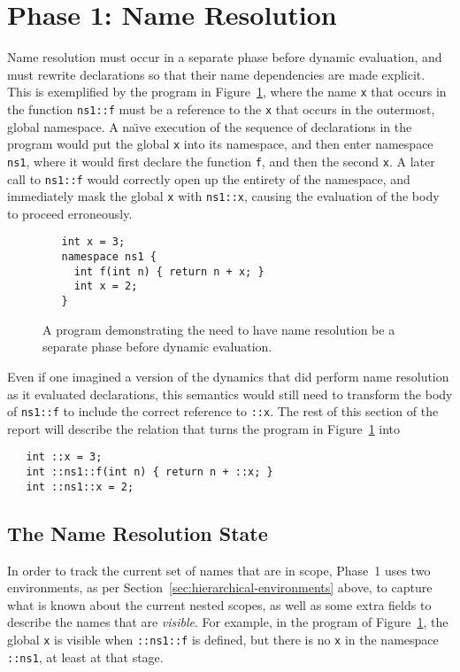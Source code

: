 \documentclass[11pt]{article}
\newcommand{\naive}{na\"\i{}ve}
\begin{document}
\section{Phase 1: Name Resolution}
\label{sec:phase1}

Name resolution must occur in a separate phase before dynamic
evaluation, and must rewrite declarations so that their name
dependencies are made explicit.  This is exemplified by the program in
Figure~\ref{fig:name-res-separate-phase}, where the name \texttt{x}
that occurs in the function \texttt{ns1::f} must be a reference to the
\texttt{x} that occurs in the outermost, global namespace.  A \naive{}
execution of the sequence of declarations in the program would put the
global \texttt{x} into its namespace, and then enter namespace
\texttt{ns1}, where it would first declare the function \texttt{f},
and then the second \texttt{x}.  A later call to \texttt{ns1::f} would
correctly open up the entirety of the namespace, and immediately mask
the global \texttt{x} with \texttt{ns1::x}, causing the evaluation of
the body to proceed erroneously.
\begin{figure}[htbp]
\begin{verbatim}
   int x = 3; 
   namespace ns1 { 
     int f(int n) { return n + x; }
     int x = 2;
   }
\end{verbatim}
\caption{A program demonstrating the need to have name resolution be a
  separate phase before dynamic evaluation.}
\label{fig:name-res-separate-phase}
\end{figure}

Even if one imagined a version of the dynamics that did perform name
resolution as it evaluated declarations, this semantics would still
need to transform the body of \texttt{ns1::f} to include the correct
reference to \texttt{::x}.  The rest of this section of the report
will describe the relation that turns the program in
Figure~\ref{fig:name-res-separate-phase} into 
\begin{verbatim}
   int ::x = 3;
   int ::ns1::f(int n) { return n + ::x; }
   int ::ns1::x = 2;
\end{verbatim}

\subsection{The Name Resolution State}
\label{sec:name-resol-state}

In order to track the current set of names that are in scope, Phase~1
uses two environments, as per
Section~\ref{sec:hierarchical-environments} above, to capture what is
known about the current nested scopes, as well as some extra fields to
describe the names that are \emph{visible}.  For example, in the
program of Figure~\ref{fig:name-res-separate-phase}, the global
\texttt{x} is visible when \texttt{::ns1::f} is defined, but there is
no \texttt{x} in the namespace \texttt{::ns1}, at least at that stage.
\end{document}
